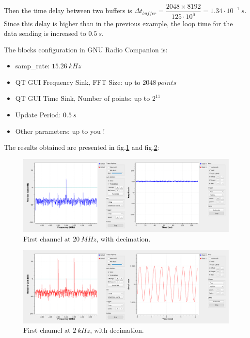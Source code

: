 \documentclass[12pt,oneside]{article}
\begin{document}
Then the time delay between two buffers is $\Delta t_{buffer}=\dfrac{2048\times 8192}{125\cdot10^6}=1.34\cdot10^{-1}~s$. Since this delay is higher than in the previous example, the loop time for the data sending is increased to $0.5~s$.
\newline

The blocks configuration in GNU Radio Companion is:
\begin{itemize}
	\setlength\itemsep{-0.2cm}
	\item samp\_rate: $15.26~kHz$
	\item QT GUI Frequency Sink, FFT Size: up to $2048~points$
	\item QT GUI Time Sink, Number of points: up to $2^{11}$
	\item Update Period: $0.5~s$
	\item Other parameters: up to you !
\end{itemize}

The results obtained are presented in fig.\ref{fig:gnuMoych1} and fig.\ref{fig:gnuMoych2}:

\begin{figure}[h!tb]
	\begin{center}
		\includegraphics[width=16cm,trim={0cm 0cm 0cm 0cm}, clip]{scope/gnu/Mch1.png}
		\caption{First channel at $20~MHz$, with decimation.}
		\label{fig:gnuMoych1}
	\end{center}
\end{figure}

\begin{figure}[h!tb]
	\begin{center}
		\includegraphics[width=16cm,trim={0cm 0cm 0cm 0cm}, clip]{scope/gnu/Mch2.png}
		\caption{First channel at $2~kHz$, with decimation.}
		\label{fig:gnuMoych2}
	\end{center}
\end{figure}
\end{document}
